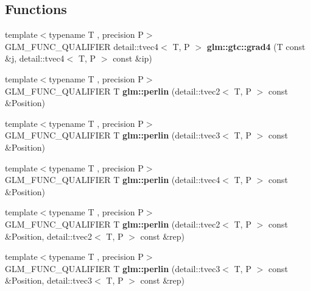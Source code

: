 \subsection*{Functions}
\begin{DoxyCompactItemize}
\item 
{\footnotesize template$<$typename T , precision P$>$ }\\G\+L\+M\+\_\+\+F\+U\+N\+C\+\_\+\+Q\+U\+A\+L\+I\+F\+I\+ER detail\+::tvec4$<$ T, P $>$ {\bfseries glm\+::gtc\+::grad4} (T const \&j, detail\+::tvec4$<$ T, P $>$ const \&ip)\hypertarget{noise_8inl_a60a628dac031a1bafeead87b20b1b641}{}\label{noise_8inl_a60a628dac031a1bafeead87b20b1b641}

\item 
{\footnotesize template$<$typename T , precision P$>$ }\\G\+L\+M\+\_\+\+F\+U\+N\+C\+\_\+\+Q\+U\+A\+L\+I\+F\+I\+ER T {\bfseries glm\+::perlin} (detail\+::tvec2$<$ T, P $>$ const \&Position)\hypertarget{namespaceglm_aaf4944b3c2a00c1e7a1b25b96cea6bfb}{}\label{namespaceglm_aaf4944b3c2a00c1e7a1b25b96cea6bfb}

\item 
{\footnotesize template$<$typename T , precision P$>$ }\\G\+L\+M\+\_\+\+F\+U\+N\+C\+\_\+\+Q\+U\+A\+L\+I\+F\+I\+ER T {\bfseries glm\+::perlin} (detail\+::tvec3$<$ T, P $>$ const \&Position)\hypertarget{namespaceglm_a11707c4e77f153abec905731b1ce52a0}{}\label{namespaceglm_a11707c4e77f153abec905731b1ce52a0}

\item 
{\footnotesize template$<$typename T , precision P$>$ }\\G\+L\+M\+\_\+\+F\+U\+N\+C\+\_\+\+Q\+U\+A\+L\+I\+F\+I\+ER T {\bfseries glm\+::perlin} (detail\+::tvec4$<$ T, P $>$ const \&Position)\hypertarget{namespaceglm_ac5aa8a72ead80436e891284db02a2f20}{}\label{namespaceglm_ac5aa8a72ead80436e891284db02a2f20}

\item 
{\footnotesize template$<$typename T , precision P$>$ }\\G\+L\+M\+\_\+\+F\+U\+N\+C\+\_\+\+Q\+U\+A\+L\+I\+F\+I\+ER T {\bfseries glm\+::perlin} (detail\+::tvec2$<$ T, P $>$ const \&Position, detail\+::tvec2$<$ T, P $>$ const \&rep)\hypertarget{namespaceglm_aa7529608f67b6200929a30cc5e3f5c71}{}\label{namespaceglm_aa7529608f67b6200929a30cc5e3f5c71}

\item 
{\footnotesize template$<$typename T , precision P$>$ }\\G\+L\+M\+\_\+\+F\+U\+N\+C\+\_\+\+Q\+U\+A\+L\+I\+F\+I\+ER T {\bfseries glm\+::perlin} (detail\+::tvec3$<$ T, P $>$ const \&Position, detail\+::tvec3$<$ T, P $>$ const \&rep)\hypertarget{namespaceglm_adc2ed67b3bf55ef9fcf95dae1b980148}{}\label{namespaceglm_adc2ed67b3bf55ef9fcf95dae1b980148}


\end{DoxyCompactItemize}
